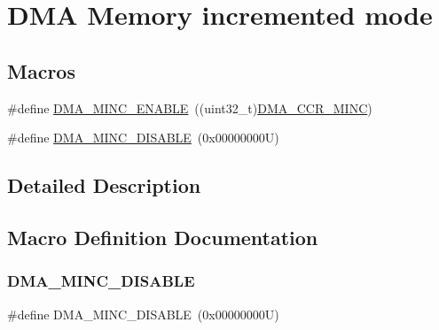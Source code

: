 \hypertarget{group___d_m_a___memory__incremented__mode}{}\section{D\+MA Memory incremented mode}
\label{group___d_m_a___memory__incremented__mode}
\subsection*{Macros}
\begin{DoxyCompactItemize}
\item 
\#define \hyperlink{group___d_m_a___memory__incremented__mode_ga43d30885699cc8378562316ff4fed1cd}{D\+M\+A\+\_\+\+M\+I\+N\+C\+\_\+\+E\+N\+A\+B\+LE}~((uint32\+\_\+t)\hyperlink{group___peripheral___registers___bits___definition_gaa189138f534283d876f654ec9474987e}{D\+M\+A\+\_\+\+C\+C\+R\+\_\+\+M\+I\+NC})
\item 
\#define \hyperlink{group___d_m_a___memory__incremented__mode_ga32625330516c188151743473fad97a33}{D\+M\+A\+\_\+\+M\+I\+N\+C\+\_\+\+D\+I\+S\+A\+B\+LE}~(0x00000000\+U)
\end{DoxyCompactItemize}


\subsection{Detailed Description}


\subsection{Macro Definition Documentation}
\mbox{\label{group___d_m_a___memory__incremented__mode_ga32625330516c188151743473fad97a33}} 
\subsubsection{\texorpdfstring{D\+M\+A\+\_\+\+M\+I\+N\+C\+\_\+\+D\+I\+S\+A\+B\+LE}{DMA\_MINC\_DISABLE}}
{\footnotesize\ttfamily \#define D\+M\+A\+\_\+\+M\+I\+N\+C\+\_\+\+D\+I\+S\+A\+B\+LE~(0x00000000\+U)}

